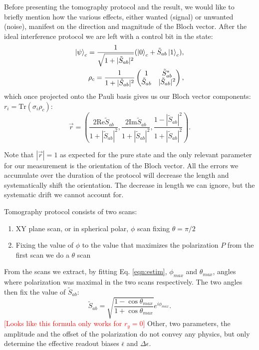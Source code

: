 \documentclass[two column]{article}
\newcommand{\caro}[1]{\textcolor{red}{[#1]}}
\begin{document}
Before presenting the tomography protocol and the result, we would like to briefly mention how the various effects, either wanted (signal) or unwanted (noise), manifest on the direction and magnitude of the Bloch vector.
After the ideal interference protocol we are left with a control bit in the state:
\begin{equation}
\begin{split}
    \ket{\psi}_c = \frac{1}{\sqrt{1+|\tilde{S}_{ab}|^2}}(\ket{0}_c + \tilde{S}_{ab}\ket{1}_c),\\
    \rho_c = \frac{1}{1+|\tilde{S}_{ab}|^2}\begin{pmatrix}
    1 & \tilde{S}_{ab}^* \\
    \tilde{S}_{ab} & |\tilde{S}_{ab}|^2
    \end{pmatrix},
\end{split}
\end{equation}
which once projected onto the Pauli basis gives us our Bloch vector components: $r_i = \text{Tr}(\sigma_i\rho_c)$:
\begin{equation}
    \vec{r} = \left( \frac{2 \text{Re}\tilde{S}_{ab}}{1+|\tilde{S}_{ab}|^2}, \frac{2 \text{Im}\tilde{S}_{ab}}{1+|\tilde{S}_{ab}|^2}, \frac{1 - |\tilde{S}_{ab}|^2}{1+|\tilde{S}_{ab}|^2} \right).\label{eqn:bloch}
\end{equation}

Note that $|\vec{r}| = 1$ as expected for the pure state and the only relevant parameter for our measurement is the orientation of the Bloch vector. 
All the errors we accumulate over the duration of the protocol will decrease the length and systematically shift the orientation.
The decrease in length we can ignore, but the systematic drift we cannot account for.

Tomography protocol consists of two scans:\begin{enumerate}
    \item XY plane scan, or in spherical polar, $\phi$ scan fixing $\theta = \pi/2$
    \item Fixing the value of $\phi$ to the value that maximizes the polarization $P$ from the first scan we do a $\theta$ scan
\end{enumerate}
From the scans we extract, by fitting Eq. \ref{eqn:estim}, $\phi_{max}$ and $\theta_{max}$, angles where polarization was maximal in the two scans respectively. 
The two angles then fix the value of $\tilde{S}_{ab}$: $$\tilde{S}_{ab} = \sqrt{\frac{1-\cos{\theta_{max}}}{1+\cos{\theta_{max}}}}e^{i\phi_{max}}.$$
\caro{Looks like this formula only works for $r_y=0$}
Other, two parameters, the amplitude and the offset of the polarization do not convey any physics, but only determine the effective readout biases $\bar{\epsilon}$ and $\Delta\epsilon$.
\end{document}
